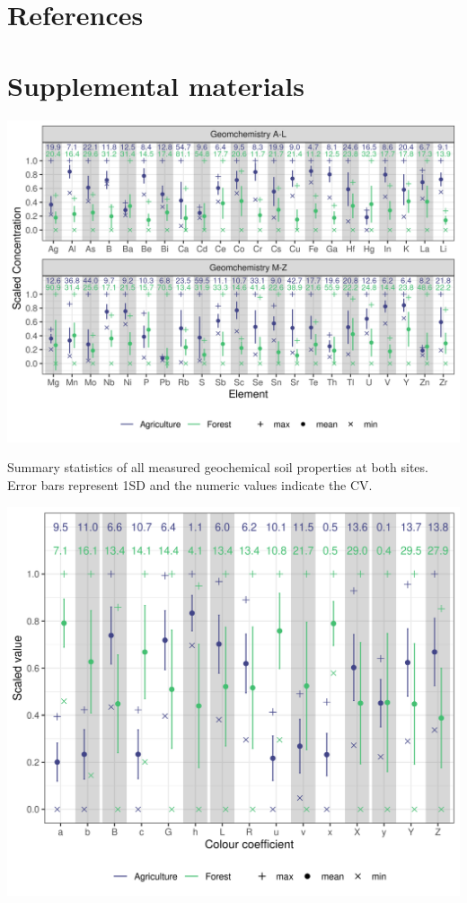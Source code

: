 \documentclass[
  number]{elsarticle}
\begin{document}
\section*{References}\label{references}

\renewcommand{\bibsection}{}


\section*{Supplemental materials}\label{supplemental-materials}

\label{ssuppfig-geo_summary}
\includegraphics[width=1\textwidth,height=\textheight]{images/geo_summary.png}

Summary statistics of all measured geochemical soil properties at both
sites. Error bars represent 1SD and the numeric values indicate the CV.

\label{ssuppfig-colour_summary}
\includegraphics[width=1\textwidth,height=\textheight]{images/colour_summary.png}
\end{document}

